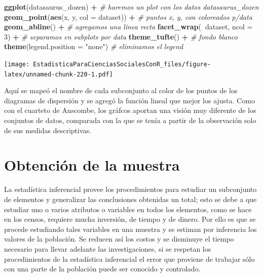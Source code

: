 \documentclass[]{book}
\newenvironment{Shaded}{\begin{snugshade}}{\end{snugshade}}
\newcommand{\CommentTok}[1]{\textcolor[rgb]{0.56,0.35,0.01}{\textit{#1}}}
\newcommand{\DataTypeTok}[1]{\textcolor[rgb]{0.13,0.29,0.53}{#1}}
\newcommand{\DecValTok}[1]{\textcolor[rgb]{0.00,0.00,0.81}{#1}}
\newcommand{\KeywordTok}[1]{\textcolor[rgb]{0.13,0.29,0.53}{\textbf{#1}}}
\newcommand{\NormalTok}[1]{#1}
\newcommand{\OperatorTok}[1]{\textcolor[rgb]{0.81,0.36,0.00}{\textbf{#1}}}
\newcommand{\StringTok}[1]{\textcolor[rgb]{0.31,0.60,0.02}{#1}}
\begin{document}
\begin{Shaded}
\begin{Highlighting}[]
\KeywordTok{ggplot}\NormalTok{(datasaurus_dozen) }\OperatorTok{+}\StringTok{ }\CommentTok{# haremos un plot con los datos datasaurus_dozen}
\StringTok{  }\KeywordTok{geom_point}\NormalTok{(}\KeywordTok{aes}\NormalTok{(x, y, }\DataTypeTok{col =}\NormalTok{ dataset)) }\OperatorTok{+}\StringTok{ }\CommentTok{# puntos x, y, con coloreados p/data}
\StringTok{  }\KeywordTok{geom_abline}\NormalTok{() }\OperatorTok{+}\StringTok{ }\CommentTok{# agregamos una linea recta}
\StringTok{  }\KeywordTok{facet_wrap}\NormalTok{(}\OperatorTok{~}\NormalTok{dataset, }\DataTypeTok{ncol =} \DecValTok{3}\NormalTok{) }\OperatorTok{+}\StringTok{ }\CommentTok{# separamos en subplots por data}
\StringTok{  }\KeywordTok{theme_tufte}\NormalTok{() }\OperatorTok{+}\StringTok{ }\CommentTok{# fondo blanco}
\StringTok{  }\KeywordTok{theme}\NormalTok{(}\DataTypeTok{legend.position =} \StringTok{"none"}\NormalTok{) }\CommentTok{# eliminamos el legend}
\end{Highlighting}
\end{Shaded}

\texttt{[image: EstadisticaParaCienciasSocialesConR\_files/figure-latex/unnamed-chunk-220-1.pdf]}

Aquí se mapeó el nombre de cada subconjunto al color de los puntos de los diagramas de dispersión y se agregó la función lineal que mejor los ajusta.
Como con el cuarteto de Anscombe, los gráfcos aportan una visión muy diferente de los conjuntos de datos, comparada con la que se tenía a partir de la observación solo de sus medidas descriptivas.

\hypertarget{obtenciuxf3n-de-la-muestra}{%
\chapter{Obtención de la muestra}\label{obtenciuxf3n-de-la-muestra}}

La estadística inferencial provee los procedimientos para estudiar un
subconjunto de elementos y generalizar las conclusiones obtenidas un
total; esto se debe a que estudiar uno o varios atributos o variables en
todos los elementos, como se hace en los censos, requiere mucha
inversión, de tiempo y de dinero. Por ello es que se procede estudiando
tales variables en una muestra y se estiman por inferencia los valores
de la población. Se reducen así los costos y se disminuye el tiempo
necesario para llevar adelante las investigaciones, si se respetan los
procedimientos de la estadística inferencial el error que proviene de
trabajar sólo con una parte de la población puede ser conocido y
controlado.
\end{document}
